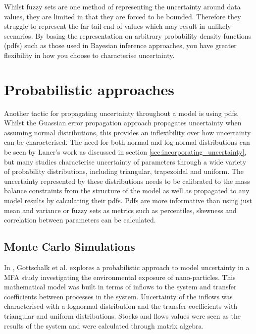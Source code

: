 \documentclass[ %
                    author={Tom Jager},
                supervisor={Dr. Daniel Schien},
                    degree={MEng},
                     title={A Bayesian Inference Engine for UMIS Structured Data},
                  subtitle={},
                      type={research},
                      year={2019} ]{dissertation}
\begin{document}
Whilst fuzzy sets are one method of representing the uncertainty around data values, they are limited in that they are forced to be bounded. Therefore they struggle to represent the far tail end of values which may result in unlikely scenarios. By basing the representation on arbitrary probability density functions (pdfs) such as those used in Bayesian inference approaches, you have greater flexibility in how you choose to characterise uncertainty.  

\section{Probabilistic approaches}
Another tactic for propagating uncertainty throughout a model is using pdfs. Whilst the Guassian error propagation approach propagates uncertainty when assuming normal distributions, this provides an inflexibility over how uncertainty can be characterised. The need for both normal and log-normal distributions can be seen by Laner's work as discussed in section \ref{sec:incorporating_uncertainty}, but many studies characterise uncertainty of parameters through a wide variety of probability distributions\cite{wernet2016ecoinvent, gottschalk2010probabilistic}, including triangular, trapezoidal and uniform. The uncertainty represented by these distributions needs to be calibrated to the mass balance constraints from the structure of the model as well as propagated to any model results by calculating their pdfs. Pdfs are more informative than using just mean and variance or fuzzy sets as metrics such as percentiles, skewness and correlation between parameters can be calculated.

\subsection{Monte Carlo Simulations}
In \cite{gottschalk2010probabilistic}, Gottschalk et al. explores a probabilistic approach to model uncertainty in a MFA study investigating the environmental exposure of nano-particles. This mathematical model was built in terms of inflows to the system and transfer coefficients between processes in the system. Uncertainty of the inflows was characterised with a lognormal distribution and the transfer coefficients with triangular and uniform distributions. Stocks and flows values were seen as the results of the system and were calculated through matrix algebra.
\end{document}
